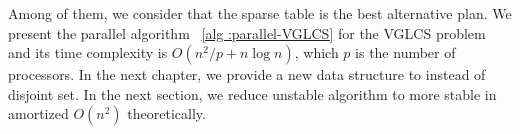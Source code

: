 Among of them, we consider that the sparse table is the best
alternative plan.  We present the parallel algorithm ~\ref{alg
:parallel-VGLCS} for the VGLCS problem and its time complexity is
$O(n^2 / p + n \log n)$, which $p$ is the number of processors. In the
next chapter, we provide a new data structure to instead of disjoint
set. In the next section, we reduce unstable algorithm to more stable
in amortized $O(n^2)$ theoretically.

\iffalse
稀疏表是我們認為最好的替代方案，其整合後為 VGLCS 平行算法 \ref{alg:parallel-VGLCS}，
算法的時間複雜度為 $O(n^2 / p + n \log n)$，其中 $p$ 為處理器個數。
在後續的章節，我們將提出新的數據結構取代并查集操作，
且能在平行算法達到理想複雜度 $O(n^2 / p + n \log n)$。
\fi

